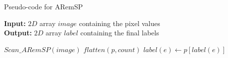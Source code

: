 \begin{algorithm}[H]
\small
{
	\caption{Pseudo-code for ARemSP}
	\label{alg:ARemSP}
	\textbf{Input:} $2D$ array $image$ containing the pixel values \\
	\textbf{Output:} $2D$ array $label$ containing the final labels
	\begin{algorithmic}[1]
		\State $Scan\_ARemSP(image)$ 
		\State $flatten(p,count)$ 
		  
				\State $label(e) \gets p[label(e)]$
			\EndFor
		\EndFor		
	\EndFunction
	\end{algorithmic}	
}
\end{algorithm}

